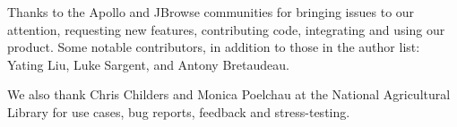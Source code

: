 Thanks to the Apollo and JBrowse communities for bringing issues to our
attention, requesting new features, contributing code, integrating and
using our product. Some notable contributors, in addition to those in
the author list: Yating Liu, Luke Sargent, and Antony Bretaudeau.

We also thank Chris Childers and Monica Poelchau at the National
Agricultural Library for use cases, bug reports, feedback and
stress-testing.

\footnotesize


\normalsize
